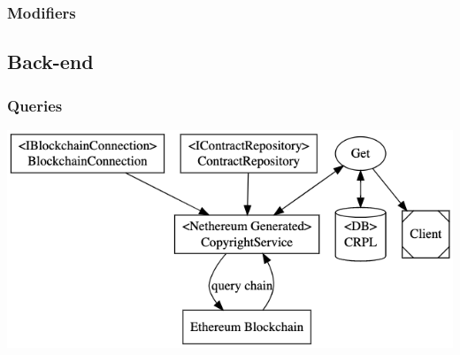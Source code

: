 \documentclass[12pt]{article}
\begin{document}
\subsubsection{Modifiers}

\subsection{Back-end}

\subsubsection{Queries}
\includegraphics[width=\textwidth,height=\textheight,keepaspectratio]{images/operational/chain-inject}
\end{document}
